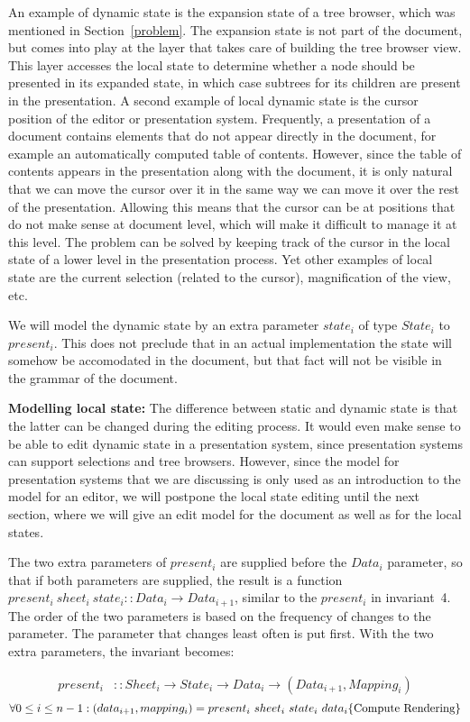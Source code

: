 An example of dynamic state is the expansion state of a tree browser, which was mentioned in Section~\ref{problem}. The expansion state is not part of the document, but comes into play at the layer that takes care of building the tree browser view. This layer accesses the local state to determine whether a node should be presented in its expanded state, in which case subtrees for its children are present in the presentation. A second example of local dynamic state is the cursor position of the editor or presentation system. Frequently, a presentation of a document contains elements that do not appear directly in the document, for example an automatically computed table of contents. However, since the table of contents appears in the presentation along with the document, it is only natural that we can move the cursor over it in the same way we can move it over the rest of the presentation. Allowing this means that the cursor can be at positions that do not make sense at document level, which will make it difficult to manage it at this level. The problem can be solved by keeping track of the cursor in the local state of a lower level in the presentation process. Yet other examples of local state are the current selection (related to the cursor), magnification of the view, etc.

We will model the dynamic state by an extra parameter $state_i$ of type $State_i$ to $present_i$. This does not preclude that in an actual implementation the state will somehow be accomodated in the document, but that fact will not be visible in the grammar of the document.

{\bf Modelling local state: }The difference between static and dynamic state is that the latter can be changed during the editing process. It would even make sense to be able to edit dynamic state in a presentation system, since presentation systems can support selections and tree browsers. However, since the model for presentation systems that we are discussing is only used as an introduction to the model for an editor, we will postpone the local state editing until the next section, where we will give an edit model for the document as well as for the local states. 

The two extra parameters of $present_i$ are supplied before the $Data_i$ parameter, so that if both parameters are supplied, the result is a function $present_i~sheet_i~state_i :: Data_i \rightarrow Data_{i+1}$, similar to the $present_i$ in invariant~4. The order of the two parameters is based on the frequency of changes to the parameter. The parameter that changes least often is put first. With the two extra parameters, the invariant becomes:\begin{small}\begin{align*} %
present_i & :: Sheet_i \rightarrow State_i \rightarrow Data_i \rightarrow (Data_{i+1}, Mapping_{i})\\
\end{align*}
\begin{math}
\forall 0 \le i \le n-1: \\
(data_{i+1}, mapping_{i}) = present_i~sheet_i~state_i~data_i
\hfill \text{\{Compute Rendering\}}
\end{math}\end{small}

